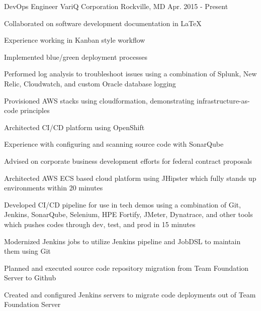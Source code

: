 

\begin{cventries}

  \cventry
    {DevOps Engineer} %
    {VariQ Corporation} %
    {Rockville, MD} %
    {Apr. 2015 - Present} %
    {
      \begin{cvitems} %
        \item {Collaborated on software development documentation in LaTeX}
        \item {Experience working in Kanban style workflow}
        \item {Implemented blue/green deployment processes}
        \item {Performed log analysis to troubleshoot issues using a combination of Splunk, New Relic, Cloudwatch, and custom Oracle database logging}
        \item {Provisioned AWS stacks using cloudformation, demonstrating infrastructure-as-code principles}
        \item {Architected CI/CD platform using OpenShift}
        \item {Experience with configuring and scanning source code with SonarQube}
        \item {Advised on corporate business development efforts for federal contract proposals}
        \item {Architected AWS ECS based cloud platform using JHipster which fully stands up environments within 20 minutes}
        \item {Developed CI/CD pipeline for use in tech demos using a combination of Git, Jenkins, SonarQube, Selenium, HPE Fortify, JMeter, Dynatrace, and other tools which pushes codes through dev, test, and prod in 15 minutes}
        \item {Modernized Jenkins jobs to utilize Jenkins pipeline and JobDSL to maintain them using Git}
        \item {Planned and executed source code repository migration from Team Foundation Server to Github}
        \item {Created and configured Jenkins servers to migrate code deployments out of Team Foundation Server}

\end{cvitems}}
\end{cventries}
